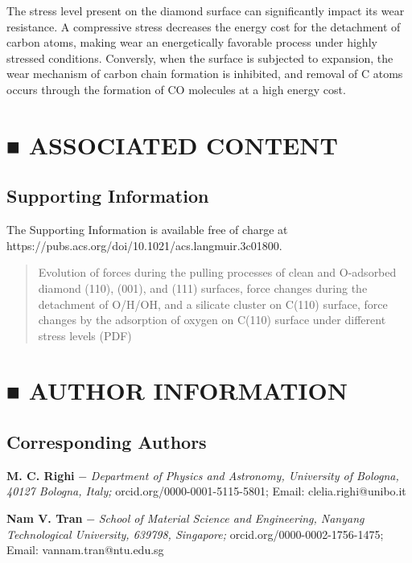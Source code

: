 \documentclass{article}
\begin{document}
The stress level present on the diamond surface can significantly impact its wear resistance. A compressive stress decreases the energy cost for the detachment of carbon atoms, making wear an energetically favorable process under highly stressed conditions. Conversly, when the surface is subjected to expansion, the wear mechanism of carbon chain formation is inhibited, and removal of C atoms occurs through the formation of CO molecules at a high energy cost.

\section*{■ ASSOCIATED CONTENT}

\subsection*{Supporting Information}

The Supporting Information is available free of charge at https://pubs.acs.org/doi/10.1021/acs.langmuir.3c01800.

\begin{quote}
Evolution of forces during the pulling processes of clean and O-adsorbed diamond (110), (001), and (111) surfaces, force changes during the detachment of O/H/OH, and a silicate cluster on C(110) surface, force changes by the adsorption of oxygen on C(110) surface under different stress levels (PDF)
\end{quote}

\section*{■ AUTHOR INFORMATION}

\subsection*{Corresponding Authors}

\noindent\textbf{M. C. Righi} − \textit{Department of Physics and Astronomy, University of Bologna, 40127 Bologna, Italy;} orcid.org/0000-0001-5115-5801; Email: clelia.righi@unibo.it

\noindent\textbf{Nam V. Tran} − \textit{School of Material Science and Engineering, Nanyang Technological University, 639798, Singapore;} orcid.org/0000-0002-1756-1475; Email: vannam.tran@ntu.edu.sg
\end{document}
